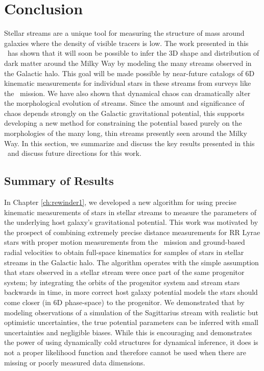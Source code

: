 \chapter[Conclusion]{Conclusion}
\label{ch:conclusion}

Stellar streams are a unique tool for measuring the structure of mass around galaxies where the density of visible tracers is low. The work presented in this \article\ has shown that it will soon be possible to infer the 3D shape and distribution of dark matter around the Milky Way by modeling the many streams observed in the Galactic halo. This goal will be made possible by near-future catalogs of 6D kinematic measurements for individual stars in these streams from surveys like the \gaia\ mission. We have also shown that dynamical chaos can dramatically alter the morphological evolution of streams. Since the amount and significance of chaos depends strongly on the Galactic gravitational potential, this supports developing a new method for constraining the potential based purely on the morphologies of the many long, thin streams presently seen around the Milky Way. In this section, we summarize and discuss the key results presented in this \article\ and discuss future directions for this work.

\section{Summary of Results} \label{sec:summary}

In Chapter \ref{ch:rewinder1}, we developed a new algorithm for using precise kinematic measurements of stars in stellar streams to measure the parameters of the underlying host galaxy's gravitational potential. This work was motivated by the prospect of combining extremely precise distance measurements for RR Lyrae stars with proper motion measurements from the \gaia\ mission and ground-based radial velocities to obtain full-space kinematics for samples of stars in stellar streams in the Galactic halo. The algorithm operates with the simple assumption that stars observed in a stellar stream were once part of the same progenitor system; by integrating the orbits of the progenitor system and stream stars backwards in time, in more correct host galaxy potential models the stars should come closer (in 6D phase-space) to the progenitor. We demonstrated that by modeling observations of a simulation of the Sagittarius stream with realistic but optimistic uncertainties, the true potential parameters can be inferred with small uncertainties and negligible biases. While this is encouraging and demonstrates the power of using dynamically cold structures for dynamical inference, it does is not a proper likelihood function and therefore cannot be used when there are missing or poorly measured data dimensions.

